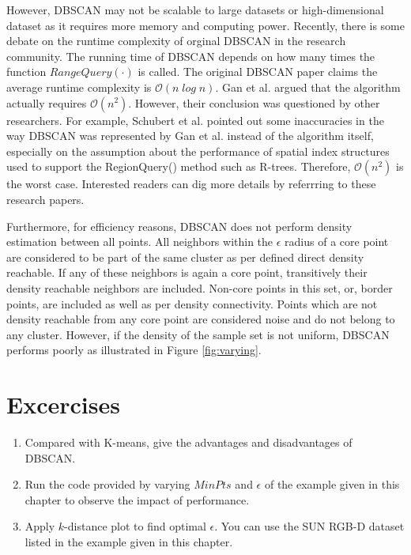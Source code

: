 However, DBSCAN may not be scalable to large datasets or 
high-dimensional dataset as it requires more memory and computing power. 
Recently, there is some debate on the runtime complexity of orginal DBSCAN in the
research community. The running time of DBSCAN depends on how many times the function
$RangeQuery(\cdot)$ is called. The original DBSCAN paper claims the average runtime 
complexity is 
$\mathit{\mathcal{O}(n \log n)}$. Gan et al. \cite{gan2015dbscan} argued that the algorithm actually requires $\mathcal{O}(n^{2})$.  However, their conclusion was questioned by other researchers. For example, Schubert et al. \cite{schubert2017dbscan} pointed out some inaccuracies in the way DBSCAN was represented by Gan et al. \cite{gan2015dbscan} instead of the algorithm itself, especially on the assumption about the performance of spatial index structures used to support the RegionQuery() method such as R-trees. Therefore, $\mathcal{O}(n^{2})$ is the worst case. Interested readers can dig more details by referrring to these 
research papers.  


Furthermore, for efficiency reasons, DBSCAN does not perform density estimation between 
all points. All neighbors within the $\epsilon$ radius of a core point are 
considered to be part of the same cluster as per defined direct density reachable.
If any of these neighbors is again a core point, transitively 
their density reachable neighbors are included. Non-core 
points in this set, or,
border points, are included as well as per density connectivity. 
Points which are not density reachable from
any core point are considered noise and do not belong to any cluster. However, 
if the density of the sample set is not uniform, DBSCAN performs poorly as illustrated in Figure \ref{fig:varying}. 

\section{Excercises}

\begin{enumerate}

\item Compared with K-means, give the advantages and disadvantages of DBSCAN. 

\item Run the code provided by varying $MinPts$ and $\epsilon$ of the example given in this chapter to observe the impact of performance.

\item Apply $k$-distance plot to find optimal $\epsilon$. You can use the SUN RGB-D dataset listed in the example given in this chapter. 
\end{enumerate}

